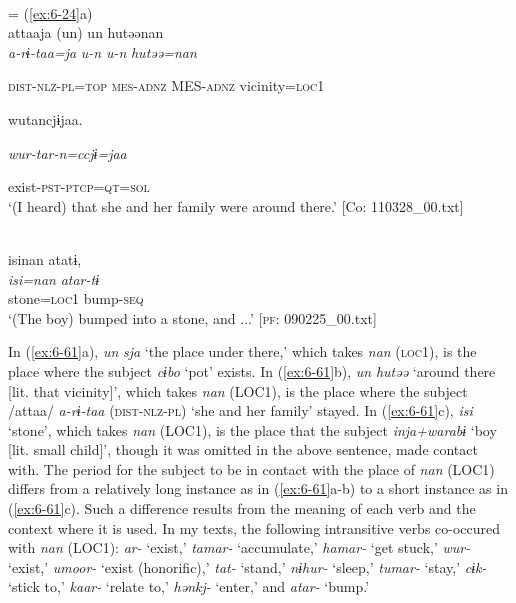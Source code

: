 \begin{table}
\ex{}\\
\glll = (\ref{ex:6-24}a)\\

{\TM}
\glll attaaja  (un)  un  hutəənan\\

      \textit{a-rɨ-taa=ja}  \textit{u-n}  \textit{u-n}  \textit{hutəə=nan}

      \textsc{dist}-\textsc{nlz}-\textsc{pl}=\textsc{top}  \textsc{mes}-\textsc{adnz}  MES-\textsc{adnz}  vicinity=\textsc{loc}1

      wutancjɨjaa.

      \textit{wur-tar-n=ccjɨ=jaa}

      exist-\textsc{pst}-\textsc{ptcp}=\textsc{qt}=\textsc{sol}\\
\glt ‘(I heard) that she and her family were around there.’ [Co: 110328\_00.txt]
\z

\ex{}\\
{\TM}
\glll  isinan  atatɨ,\\
\textit{isi=nan}  \textit{atar-tɨ}\\
stone=\textsc{loc}1  bump-\textsc{seq}\\
\glt ‘(The boy) bumped into a stone, and ...’ [\textsc{pf}: 090225\_00.txt]
\z

In (\ref{ex:6-61}a), \textit{un} \textit{sja} ‘the place under there,’ which takes \textit{nan} (\textsc{loc}1), is the place where the subject \textit{cɨbo} ‘pot’ exists. In (\ref{ex:6-61}b), \textit{un} \textit{hutəə} ‘around there [lit. that vicinity]’, which takes \textit{nan} (LOC1), is the place where the subject /attaa/ \textit{a-rɨ-taa} (\textsc{dist}-\textsc{nlz}-\textsc{pl}) ‘she and her family’ stayed. In (\ref{ex:6-61}c), \textit{isi} ‘stone’, which takes \textit{nan} (LOC1), is the place that the subject \textit{inja+warabɨ} ‘boy [lit. small child]’, though it was omitted in the above sentence, made contact with. The period for the subject to be in contact with the place of \textit{nan} (LOC1) differs from a relatively long instance as in (\ref{ex:6-61}a-b) to a short instance as in (\ref{ex:6-61}c). Such a difference results from the meaning of each verb and the context where it is used. In my texts, the following intransitive verbs co-occured with \textit{nan} (LOC1): \textit{ar-} ‘exist,’ \textit{tamar-} ‘accumulate,’ \textit{hamar-} ‘get stuck,’ \textit{wur-} ‘exist,’ \textit{umoor-} ‘exist (honorific),’ \textit{tat-} ‘stand,’ \textit{nɨhur-} ‘sleep,’ \textit{tumar-} ‘stay,’ \textit{cɨk-} ‘stick to,’ \textit{kaar-} ‘relate to,’ \textit{hənkj-} ‘enter,’ and \textit{atar-} ‘bump.’


\end{table}

